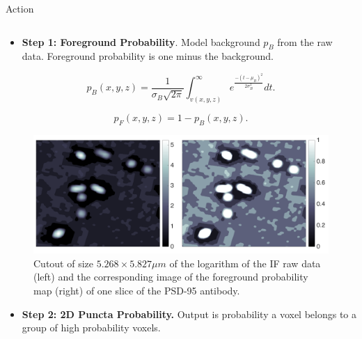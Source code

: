 \documentclass[final, table]{beamer}
\newlength{\onecolwid}
\newlength{\twocolwid}
\begin{document}
\begin{frame}[t]
\begin{columns}[t]
\begin{column}{\twocolwid}
\begin{block}{Action}
\begin{columns}[t]
\begin{column}{\onecolwid}
\begin{itemize} 
\item \textbf{Step 1: Foreground Probability}. Model background $p_B$ from the raw data. Foreground probability is one minus the background. 
\end{itemize} 

\begin{equation} 
p_B(x,y,z) = \frac{1}{\sigma_B \sqrt{2 \pi}} \int^{\infty}_{v(x,y,z)} e^{\frac{-(t - \mu_B)^2}{2 \sigma_B^2}} d t.
\end{equation} 

\begin{equation}
p_F(x,y,z) = 1 - p_B(x,y,z).
\end{equation}

\begin{figure}
\centering
\includegraphics[width=1\textwidth]{figs/lograw_prob}
\caption{Cutout of size $5.268 \times 5.827 \mu m$ of the logarithm of the IF raw data (left) and the corresponding image of the foreground probability map (right) of one slice of the PSD-95 antibody. }
\label{fig:raw_prob} 
\end{figure}

\begin{itemize} 
\item \textbf{Step 2: 2D Puncta Probability.}  Output is probability a voxel belongs to a group of high probability voxels. 
\end{itemize} 



\end{column}
\end{columns}
\end{block}
\end{column}
\end{columns}
\end{frame}
\end{document}
